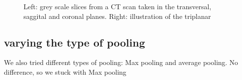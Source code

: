 \begin{figure}
\centering
\begin{minipage}{0.45\textwidth}
\centering
{}
\end{minipage}\hfill
\hspace{-1cm}
\begin{minipage}{0.45\textwidth}
\centering
{}
\end{minipage}
\caption{Left: grey scale slices from a CT scan taken in the transversal, saggital and coronal planes. Right: illustration of the triplanar}
\end{figure}


\subsection{varying the type of pooling}

We also tried different types of pooling: Max pooling and average pooling. No difference, so we stuck with Max pooling

